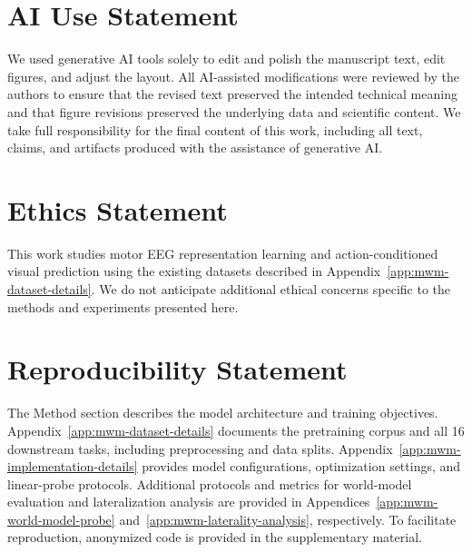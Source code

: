 \section*{AI Use Statement}

We used generative AI tools solely to edit and polish the manuscript text, edit figures, and adjust the layout. All AI-assisted modifications were reviewed by the authors to ensure that the revised text preserved the intended technical meaning and that figure revisions preserved the underlying data and scientific content. We take full responsibility for the final content of this work, including all text, claims, and artifacts produced with the assistance of generative AI.

\section*{Ethics Statement}

This work studies motor EEG representation learning and action-conditioned visual prediction using the existing datasets described in Appendix~\ref{app:mwm-dataset-details}. We do not anticipate additional ethical concerns specific to the methods and experiments presented here.

\section*{Reproducibility Statement}

The Method section describes the model architecture and training objectives. Appendix~\ref{app:mwm-dataset-details} documents the pretraining corpus and all 16 downstream tasks, including preprocessing and data splits. Appendix~\ref{app:mwm-implementation-details} provides model configurations, optimization settings, and linear-probe protocols. Additional protocols and metrics for world-model evaluation and lateralization analysis are provided in Appendices~\ref{app:mwm-world-model-probe} and~\ref{app:mwm-laterality-analysis}, respectively. To facilitate reproduction, anonymized code is provided in the supplementary material.
